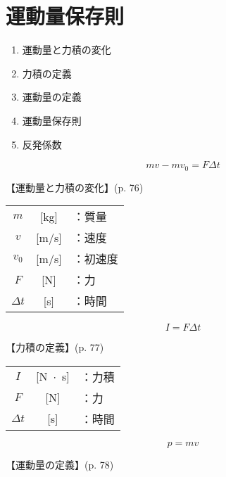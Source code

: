 \documentclass[10pt]{jarticle}
\begin{document}
\newpage
\addtocounter{page}{-1}
\thispagestyle{empty}
\section{運動量保存則}

\begin{enumerate}
\setcounter{enumi}{\thepage}
\small
\itemsep-4mm
\item 運動量と力積の変化\\
\item 力積の定義\\
\item 運動量の定義\\
\item 運動量保存則\\
\item 反発係数
\end{enumerate}




\newpage
\[
	mv - mv_0 = F \mathit{\Delta}t
\]


\vskip3mm
【運動量と力積の変化】{\footnotesize (p. 76)}

\begin{tabular}{ccl}
$m$	&[kg]	&：質量\\
$v$	&[m/s]	&：速度\\
$v_0$	&[m/s]	&：初速度\\
$F$	&[N]	&：力\\
$\mathit{\Delta}t$	&[s]	&：時間
\end{tabular}






\newpage
\[
	I = F \mathit{\Delta}t
\]


\vskip3mm
【力積の定義】{\footnotesize (p. 77)}

\begin{tabular}{ccl}
$I$	&[N $\!\! \cdot \!\!$ s]	&：力積\\
$F$	&[N]	&：力\\
$\mathit{\Delta}t$	&[s]	&：時間
\end{tabular}





\newpage
\[
	p = mv
\]


\vskip3mm
【運動量の定義】{\footnotesize (p. 78)}
\end{document}
